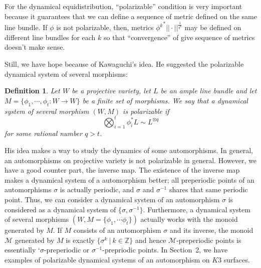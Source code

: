 \documentclass[11pt,letterpaper]{amsart}
\newtheorem{df}[thm]{Definition}
\begin{document}
    For the dynamical equidistribution, ``polarizable'' condition is very important because it guarantees that we can define a sequence of metric defined on the same line bundle. If $\phi$ is not polarizable, then, metrics ${\phi^k}^*||\cdot||^{\frac{1}{q^k}}$ may be defined on different line bundles for each $k$ so that ``convergence'' of give sequence of metrics doesn't make sense.

    Still, we have hope because of Kawaguchi's idea. He \cite{K0} suggested the polarizable dynamical system of several morphisms:
    \begin{df}
    Let $W$ be a projective variety, let $L$ be an ample line bundle and let $M=\{ \phi_1, \cdots, \phi_t:W \rightarrow W\}$ be a finite set of morphisms. We say that a dynamical system of several morphism $(W, M)$ is \emph{polarizable} if
    \[
    \bigotimes_{i=1}^t \phi_i^*L \sim L^{\otimes q}
    \]
    for some rational number $q>t$.
    \end{df}

    His idea makes a way to study the dynamics of some automorphisms. In general, an automorphisms on projective variety is not polarizable in general. However, we have a good counter part, the inverse map. The existence of the inverse map makes a dynamical system of a automorphism better; all preperiodic points of an automorphisms $\sigma$ is actually periodic, and $\sigma$ and $\sigma^{-1}$ shares that same periodic point. Thus, we can consider a dynamical system of an automorphism $\sigma$ is considered as a dynamical system of $\{\sigma, \sigma^{-1}\}$. Furthermore, a dynamical system of several morphisms $(W, M=\{\phi_1, \cdots \phi_t\})$ actually works with the monoid generated by $M$. If $M$ consists of an automorphism $\sigma$ and its inverse, the monoid $\mathcal{M}$ generated by $M$ is exactly $\{ \sigma^k ~|~ k \in \mathbb{Z}\}$ and hence $\mathcal{M}$-preperiodic points is essentially `$\sigma$-preperiodic or $\sigma^{-1}$-prepriodic points. In Section~2, we have examples of polarizable dynamical systems of an automorphism on $K3$ surfaces.
\end{document}

